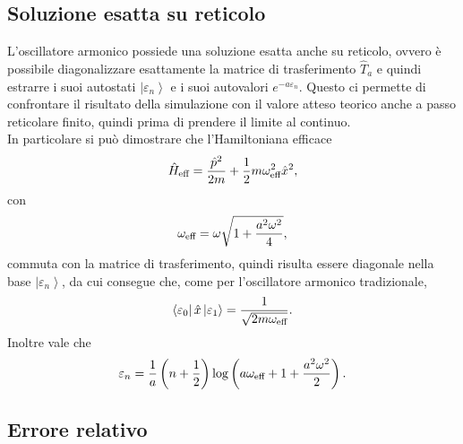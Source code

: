 \documentclass{article}
\begin{document}
\subsection{Soluzione esatta su reticolo}

L'oscillatore armonico possiede una soluzione esatta anche su reticolo, ovvero è possibile diagonalizzare esattamente la matrice di trasferimento $\hat{T}_a$ e quindi estrarre i suoi autostati $\left|\varepsilon_n\right>$ e i suoi autovalori $e^{-a\varepsilon_n}$. Questo ci permette di confrontare il risultato della simulazione con il valore atteso teorico anche a passo reticolare finito, quindi prima di prendere il limite al continuo. \\
In particolare si può dimostrare che l'Hamiltoniana efficace
\begin{equation}
    \hat{H}_{\textup{eff}}=\frac{\hat{p}^2}{2m}+\frac{1}{2}m\omega_{\textup{eff}}^2\hat{x}^2,
\end{equation}
con 
\begin{equation}
    \omega_\textup{eff}=\omega\sqrt{1+\frac{a^2\omega^2}{4}},
\end{equation}
commuta con la matrice di trasferimento, quindi risulta essere diagonale nella base $\left|\varepsilon_n\right>$, da cui consegue che, come per l'oscillatore armonico tradizionale,
\begin{equation}
    \label{el mat esatto}
    \left<\varepsilon_0\right|\hat{x}\left|\varepsilon_1\right>=\frac{1}{\sqrt{2m\omega_\textup{eff}}}.
\end{equation}
Inoltre vale che 
\begin{equation}
    \label{energia esatto}
    \varepsilon_n=\frac{1}{a}\left(n+\frac{1}{2}\right)\log\left(a\omega_\textup{eff}+1+\frac{a^2\omega^2}{2}\right).
\end{equation}

\subsection{Errore relativo}
\end{document}
